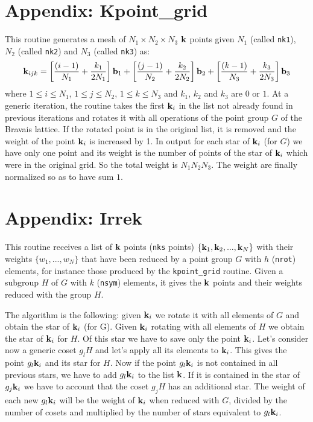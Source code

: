 \documentclass[12pt,a4paper,twoside]{report}
\begin{document}
\section{Appendix: Kpoint\_grid}

This routine generates a mesh of $N_1\times N_2\times N_3$ ${\bf k}$ points 
given $N_1$ (called
\texttt{nk1}), $N_2$ (called \texttt{nk2}) and $N_3$ (called \texttt{nk3})
as:
\begin{equation}
{\bf k}_{ijk} = \left[{(i-1) \over N_1} + {k_1\over 2 N_1}\right] {\bf b}_1 +
                \left[{(j-1) \over N_2} + {k_2\over 2 N_2}\right] {\bf b}_2 +
                \left[{(k-1) \over N_3} + {k_3\over 2 N_3}\right] {\bf b}_3 
\end{equation}
where $1\le i \le N_1$, $1\le j \le N_2$, $1\le k \le N_3$ and $k_1$,
$k_2$ and $k_3$ are $0$ or $1$.
At a generic iteration, the routine takes the first ${\bf k}_i$ in the
list not already found in previous iterations and rotates it with all 
operations of the point group $G$ of the Bravais lattice. If the rotated 
point is in the original list, it is removed and the 
weight of the point ${\bf k}_i$ is increased by 1. In output 
for each star of ${\bf k}_i$ (for $G$) we have only one point and its weight 
is the number of points of the star of ${\bf k}_i$ which were in the 
original grid.
So the total weight is $N_1 N_2 N_3$. The weight are finally normalized
so as to have sum $1$.

\section{Appendix: Irrek}
This routine receives a list of ${\bf k}$ points (\texttt{nks} points) 
$\{{\bf k}_1, {\bf k}_2,...,{\bf k}_N\}$ with their weights
$\{w_1,...,w_N\}$ that have been reduced by a point group $G$ with $h$ 
(\texttt{nrot}) elements, for instance those produced by 
the \texttt{kpoint\_grid} routine.
Given a subgroup $H$ of $G$ with $k$ (\texttt{nsym}) elements, it gives 
the ${\bf k}$ points and their weights reduced with the group $H$.

The algorithm is the following: given ${\bf k}_i$ we rotate it with 
all elements of $G$ and obtain the star of ${\bf k}_i$ (for G). 
Given ${\bf k}_i$ rotating with all elements of $H$ we obtain the star 
of ${\bf k}_i$ for $H$. Of this star we have to save only the point 
${\bf k}_i$. 
Let's consider now a generic coset $g_l H$ and let's apply all its
elements to ${\bf k}_i$. This gives the point 
$g_l {\bf k}_i$ and its star for $H$. Now if the point $g_l {\bf k}_i$ 
is not contained in all previous stars, we have to add $g_l {\bf k}_i$ 
to the list ${\bf k}$. If it is contained in the star of
$g_j {\bf k}_i$ we have to account that the coset $g_jH$ has an additional
star. The weight of each new $g_l {\bf k}_i$ will be the weight of
${\bf k}_i$ when reduced with $G$, divided by the number of cosets and
multiplied by the number of stars equivalent to $g_l {\bf k}_i$. 
\end{document}
